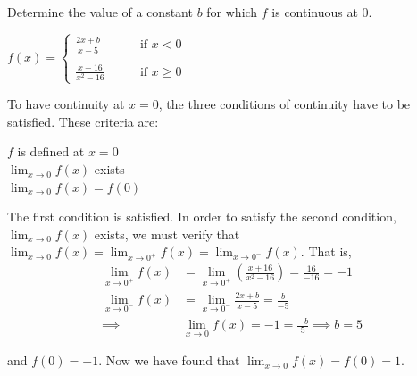 \documentclass[nooutcomes]{ximera}
\begin{document}
\begin{problem}
Determine the value of a constant $b$ for which $f$ is continuous at $0$.
	
	$f(x) =   \left\{ \begin{array}{ll}
	\frac{2x+b}{x-5}	 	&	\qquad \text{if } x < 0	\\ \\
	\frac{x+16}{x^2-16}		&	\qquad \text{if } x \ge 0	\end{array} \right.  $

	\begin{freeResponse}
	
To have continuity at $x = 0$, the three conditions of continuity have to be satisfied.  These criteria are:
	\begin{center}
	  $f$ is defined at $x = 0$\\

     	 $\lim_{x \to 0} f(x)$ exists\\

    	  $\lim_{x \to 0} f(x) = f(0)$
	\end{center}

The first condition is satisfied.  In order to satisfy the second condition,  $\lim_{x \to 0} f(x)$ exists, we must verify that $\lim_{x \to 0} f(x)=\lim_{x \to 0^+} f(x)=\lim_{x \to 0^-} f(x)$.
That is, 
	\begin{align*}
	\lim_{x \to 0^+} f(x)&=\lim_{x \to 0^+} \left(\frac{x+16}{x^2-16}\right)=\frac{16}{-16}=-1\\
	\lim_{x \to 0^-} f(x)&=\lim_{x \to 0^-}\frac{2x+b}{x-5}=\frac{b}{-5}\\
	\implies & \lim_{x \to 0} f(x)=-1=\frac{-b}{5} \implies b=5
	\end{align*}

and $f(0)=-1$. Now we have found that  $\lim_{x \to 0} f(x)=f(0)=1$.
	
	\end{freeResponse}
\end{problem}
	
	
\end{document}
